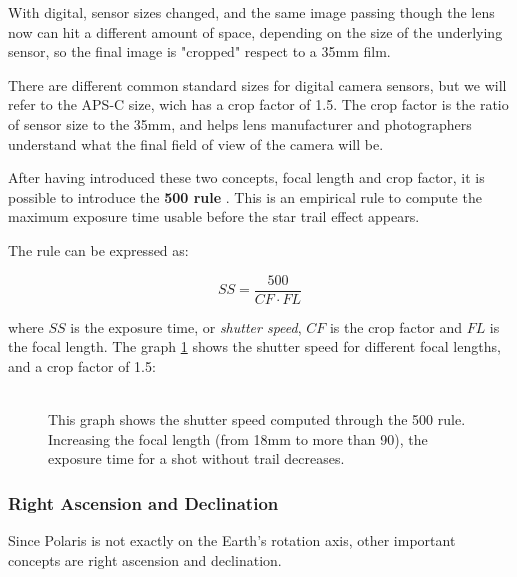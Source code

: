 \documentclass[]{article}
\begin{document}
With digital, sensor sizes changed, and the same image passing though the lens now can hit a different amount of space, depending on the size of the underlying sensor, so the final image is "cropped" respect to a 35mm film. 

There are different common standard sizes for digital camera sensors, but we will refer to the APS-C size, wich has a crop factor of 1.5. The crop factor is the ratio of sensor size to the 35mm, and helps lens manufacturer and photographers understand what the final field of view of the camera will be. 

After having introduced these two concepts, focal length and crop factor, it is possible to introduce the \textbf{500 rule}  \cite{500rule}. This is an empirical rule to compute the maximum exposure time usable before the star trail effect appears. 



The rule can be expressed as:

$$ SS = \frac{500}{CF \cdot FL}$$

where $SS$ is the exposure time, or \textit{shutter speed}, $CF$ is the crop factor and $FL$ is the focal length. The graph \ref{pic:500graph} shows the shutter speed for different focal lengths, and a crop factor of 1.5:
\\
\\
\begin{figure}[H]
	\centering
	\caption{This graph shows the shutter speed computed through the 500 rule. Increasing the focal length (from 18mm to more than 90), the exposure time for a shot without trail decreases.}
	\label{pic:500graph}
\end{figure}

\iffalse
\subsubsection{Right Ascension and Declination}
Since Polaris is not exactly on the Earth's rotation axis, other important concepts are right ascension and declination.  
\end{document}
